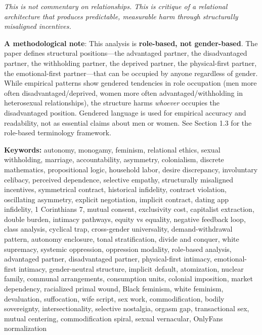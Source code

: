\documentclass[12pt, letterpaper]{article}
\begin{document}
\textit{This is not commentary on relationships. This is critique of a relational architecture that produces predictable, measurable harm through structurally misaligned incentives.}

\textbf{A methodological note}: This analysis is \textbf{role-based, not gender-based}. The paper defines structural positions---the advantaged partner, the disadvantaged partner, the withholding partner, the deprived partner, the physical-first partner, the emotional-first partner---that can be occupied by anyone regardless of gender. While empirical patterns show gendered tendencies in role occupation (men more often disadvantaged/deprived, women more often advantaged/withholding in heterosexual relationships), the structure harms \textit{whoever} occupies the disadvantaged position. Gendered language is used for empirical accuracy and readability, not as essential claims about men or women. See Section 1.3 for the role-based terminology framework.

\textbf{Keywords:} autonomy, monogamy, feminism, relational ethics, sexual withholding, marriage, accountability, asymmetry, colonialism, discrete mathematics, propositional logic, household labor, desire discrepancy, involuntary celibacy, perceived dependence, selective empathy, structurally misaligned incentives, symmetrical contract, historical infidelity, contract violation, oscillating asymmetry, explicit negotiation, implicit contract, dating app infidelity, 1 Corinthians 7, mutual consent, exclusivity cost, capitalist extraction, double burden, intimacy pathways, equity vs equality, negative feedback loop, class analysis, cyclical trap, cross-gender universality, demand-withdrawal pattern, autonomy enclosure, tonal stratification, divide and conquer, white supremacy, systemic oppression, oppression modality, role-based analysis, advantaged partner, disadvantaged partner, physical-first intimacy, emotional-first intimacy, gender-neutral structure, implicit default, atomization, nuclear family, communal arrangements, consumption units, colonial imposition, market dependency, racialized primal wound, Black feminism, white feminism, devaluation, suffocation, wife script, sex work, commodification, bodily sovereignty, intersectionality, selective nostalgia, orgasm gap, transactional sex, mutual centering, commodification spiral, sexual vernacular, OnlyFans normalization

\newpage
\tableofcontents
\newpage

\end{document}
